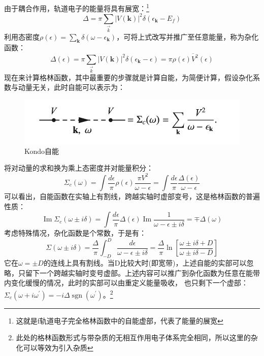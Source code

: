 \documentclass[10pt, a4paper, oneside]{ctexbook}
\begin{document}
	由于耦合作用，轨道电子的能量将具有展宽：\footnote{这就是f轨道电子完全格林函数中的自能虚部，代表了能量的展宽}
	\begin{equation}
		\Delta=\pi \sum_{\vec{k}}|V(\mathbf{k})|^2 \delta\left(\epsilon_{\mathbf{k}}-E_f\right)
	\end{equation}
	利用态密度$ \rho(\epsilon)=\sum_{\mathbf{k}} \delta\left(\omega-\epsilon_{\mathbf{k}}\right) $，可将上式改写并推广至任意能量，称为杂化函数：
	\begin{equation}
		\Delta(\epsilon)=\pi \sum_{\vec{k}}|V(\mathbf{k})|^2 \delta\left(\epsilon_{\mathbf{k}}-\epsilon\right)=\pi \overline{\rho(\epsilon) V^2(\epsilon)}
	\end{equation} 
	现在来计算格林函数，其中最重要的步骤就是计算自能，为简便计算，假设杂化系数与动量无关，此时自能可以表示为：
	\begin{figure}[htbp]
		\centering
		\includegraphics*[scale=0.7]{KondoSE.png}
		\caption{Kondo自能}
	\end{figure}
	将对动量的求和换为乘上态密度并对能量积分：
	\begin{equation}
		\Sigma_c(\omega)=\int \frac{d \epsilon}{\pi} \rho(\epsilon) \frac{\pi V^2}{\omega-\epsilon}=\int \frac{d \epsilon}{\pi} \frac{\Delta(\epsilon)}{\omega-\epsilon}
	\end{equation}
	可以看出，自能函数在实轴上有割线，跨越实轴时虚部变号，这是格林函数的普遍性质：
	\begin{equation}
		\operatorname{Im} \Sigma_c(\omega \pm i \delta)=\int \frac{d \epsilon}{\pi} \Delta(\epsilon) \operatorname{Im} \frac{1}{\omega-\epsilon \pm i \delta}=\mp \Delta(\omega)
	\end{equation}
	考虑特殊情况，杂化函数是个常数，于是有：
	\begin{equation}
		\Sigma(\omega \pm i \delta)=\frac{\Delta}{\pi} \int_{-D}^D \frac{d \epsilon}{\omega-\epsilon \pm i \delta}=\frac{\Delta}{\pi} \ln \left[\frac{\omega \pm i \delta+D}{\omega \pm i \delta-D}\right]
	\end{equation}
	它在$ \omega=\pm D $的连线上具有割线。当D比较大时(即宽带)，上述自能的实部可以忽略，只留下一个跨越实轴时变号虚部。上述内容可以推广到杂化函数为任意在能带内变化缓慢的情况，此时的实部可以由重定义能量吸收，
	也只剩下一个虚部：$ \Sigma_c\left(\omega+i \omega^{\prime}\right)=-i \Delta \operatorname{sgn}\left(\omega^{\prime}\right) $。\footnote{此处的格林函数形式与带杂质的无相互作用电子体系完全相同，所以这里的杂化可以等效为引入杂质}\\
	
\end{document}
